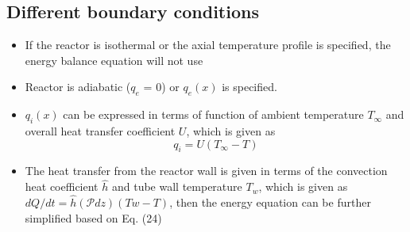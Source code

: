 \documentclass[11pt]{article}
\begin{document}
\subsection{Different boundary conditions}
\begin{itemize}
    \item If the reactor is isothermal or the axial temperature profile is specified, the energy balance equation will not use
    \item Reactor is adiabatic ($q_e$ = 0) or $q_e(x)$ is specified.
    \item $q_i(x)$ can be expressed in terms of function of ambient temperature $T_\infty$ and overall heat transfer coefficient $U$, which is given as $$q_i = U(T_\infty - T)$$
    \item The heat transfer from the reactor wall is given in terms of the convection heat coefficient $\hat{h}$ and tube wall temperature $T_w$, which is given as $dQ/dt =  \hat{h}(\mathscr{P}dz)(Tw - T)$, then the energy equation can be further simplified based on Eq. (24) 
\end{itemize}
\end{document}

